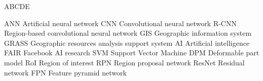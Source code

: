
\begin{seznamzkratek}{ABCDE}

	      {ANN}
	      {Artificial neural network}
	      {CNN}
	      {Convolutional neural network}
	      {R-CNN}
	      {Region-based convolutional neural network}
	      {GIS}
	      {Geographic information system}
	      {GRASS}
	      {Geographic resources analysis support system}
	      {AI}
	      {Artificial intelligence}
	      {FAIR}
	      {Facebook AI research}
	      {SVM}
	      {Support Vector Machine}
	      {DPM}
	      {Deformable part model}
	      {RoI}
	      {Region of interest}
	      {RPN}
	      {Region proposal network}
	      {ResNet}
	      {Residual network}
	      {FPN}
	      {Feature pyramid network}
	      
\end{seznamzkratek}